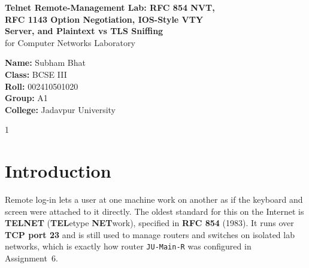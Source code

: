 \documentclass[11pt,a4paper]{article}
\begin{document}
\begin{titlepage}
    \centering
    \vspace*{4.2cm}

    {\LARGE \textbf{Telnet Remote-Management Lab: RFC 854 NVT,}}\\[0.7em]
    {\LARGE \textbf{RFC 1143 Option Negotiation, IOS-Style VTY}}\\[0.7em]
    {\LARGE \textbf{Server, and Plaintext vs TLS Sniffing}}\\[1.4em]

    {\large for Computer Networks Laboratory}

    \vspace{3.8cm}

    {\large
    \textbf{Name:} Subham Bhat\\[0.55em]
    \textbf{Class:} BCSE III\\[0.55em]
    \textbf{Roll:} 002410501020\\[0.55em]
    \textbf{Group:} A1\\[0.55em]
    \textbf{College:} Jadavpur University
    }

    \vfill
    {\normalsize 1}
\end{titlepage}

\setcounter{page}{2}
\tableofcontents
\newpage

\setcounter{page}{3}

\section{Introduction}
\noindent Remote log-in lets a user at one machine work on another as if the keyboard and screen were attached to it directly. The oldest standard for this on the Internet is \textbf{TELNET} (\textbf{TEL}etype \textbf{NET}work), specified in \textbf{RFC 854} (1983). It runs over \textbf{TCP port 23} and is still used to manage routers and switches on isolated lab networks, which is exactly how router \texttt{JU-Main-R} was configured in Assignment~6.
\end{document}
